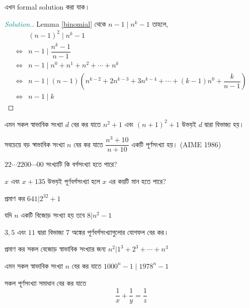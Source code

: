 \documentclass[a4paper,11pt]{article}
\newenvironment{sltn}{\begin{proof}[\emph{\textcolor{darkcyan}{Solution.}}]} {\end{proof}}
\begin{document}
এখন formal solution করা যাক। 
\begin{sltn}
	Lemma \ref{binomial} থেকে $n-1 \mid n^k-1$ তাহলে, 
	\begin{align*}
		     & (n-1)^2 \mid n^k-1                                                                  \\
		\iff & n-1 \mid \dfrac{n^k-1}{n-1}                                                         \\
		\iff & n-1 \mid n^0+n^1+n^2+\cdots+n^k                                                     \\
		\iff & n-1 \mid (n-1)\left(n^{k-2}+2n^{k-3}+3n^{k-4}+\cdots+(k-1)n^0+\dfrac{k}{n-1}\right) \\
		\iff & n-1 \mid k
	\end{align*}
\end{sltn}
\begin{Exercise}
	\label{xr-1}
	\begin{prob}
		এমন সকল স্বাভাবিক সংখ্যা $d$ বের কর যাতে $n^2+1$ এবং $(n+1)^2+1$ উভয়ই $d$ দ্বারা বিভাজ্য হয়।  
	\end{prob}
	\begin{prob}
		সবচেয়ে বড় স্বাভাবিক সংখ্যা $n$ বের কর যাতে $\dfrac{n^3+10}{n+10}$ একটি পূর্ণসংখ্যা হয়। (AIME 1986)
	\end{prob}
	\begin{prob}
		$22\cdots 2200\cdots 00$ সংখ্যাটি কি বর্গসংখ্যা হতে পারে? 
	\end{prob}
	\begin{prob}
		$x$ এবং $x+135$ উভয়ই পূর্ণবর্গসংখ্যা হলে $x$ এর কয়টি মান হতে পারে? 
	\end{prob}
	\begin{prob}
		প্রমাণ কর $641|2^{32}+1$
	\end{prob}
	\begin{prob}
		যদি $n$ একটি বিজোড় সংখ্যা হয় তবে $8|n^2-1$
	\end{prob}
	\begin{prob}
		$3,5$ এবং $11$ দ্বারা বিভাজ্য $7$ অঙ্কের পূর্ণবর্গসংখ্যাগুলোর যোগফল বের কর।  
	\end{prob}
	\begin{prob}
		প্রমাণ কর সকল বেজোড় স্বাভাবিক সংখ্যার জন্য $n^2|1^3+2^3+\cdots+n^3$
	\end{prob}
	\begin{prob}
		এমন সকল স্বাভাবিক সংখ্যা $n$ বের কর যাতে $1000^n-1 \mid 1978^n-1$
	\end{prob}
	\begin{prob}
		সকল পূর্ণসংখ্যা সমাধান বের কর যাতে 
		\[\dfrac{1}{x}+\dfrac{1}{y}=\dfrac{1}{z}\]

\end{prob}
\end{Exercise}
\end{document}
